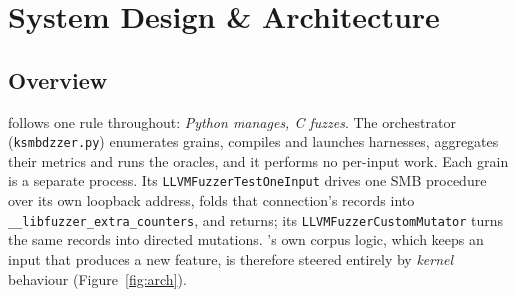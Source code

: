\documentclass{article}
\begin{document}
\section{System Design \& Architecture}\label{sec:design}

\subsection{Overview}

\toolname follows one rule throughout: \emph{Python manages, C fuzzes}. The
orchestrator (\texttt{ksmbdzzer.py}) enumerates grains, compiles and launches
harnesses, aggregates their metrics and runs the oracles, and it performs no
per-input work. Each grain is a separate \libfuzzer process. Its
\texttt{LLVMFuzzerTestOneInput} drives one SMB procedure over its own
loopback address, folds that connection's \kcovdf records into
\texttt{\_\_libfuzzer\_extra\_counters}, and returns; its
\texttt{LLVMFuzzerCustomMutator} turns the same records into directed
mutations. \libfuzzer's own corpus logic, which keeps an input that produces
a new feature, is therefore steered entirely by \emph{kernel} behaviour
(Figure~\ref{fig:arch}).
\end{document}
